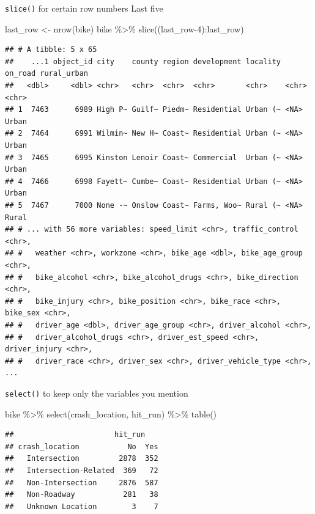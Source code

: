 \documentclass[
  ignorenonframetext,
]{beamer}
\newenvironment{Shaded}{\begin{snugshade}}{\end{snugshade}}
\newcommand{\DecValTok}[1]{\textcolor[rgb]{0.00,0.00,0.81}{#1}}
\newcommand{\FunctionTok}[1]{\textcolor[rgb]{0.00,0.00,0.00}{#1}}
\newcommand{\NormalTok}[1]{#1}
\newcommand{\OtherTok}[1]{\textcolor[rgb]{0.56,0.35,0.01}{#1}}
\newcommand{\SpecialCharTok}[1]{\textcolor[rgb]{0.00,0.00,0.00}{#1}}
\begin{document}
\begin{frame}[fragile]{\texttt{slice()} for certain row numbers}
\protect\hypertarget{slice-for-certain-row-numbers-1}{}
Last five

\begin{Shaded}
\begin{Highlighting}[]
\NormalTok{last\_row }\OtherTok{\textless{}{-}} \FunctionTok{nrow}\NormalTok{(bike)}
\NormalTok{bike }\SpecialCharTok{\%\textgreater{}\%}
  \FunctionTok{slice}\NormalTok{((last\_row}\DecValTok{{-}4}\NormalTok{)}\SpecialCharTok{:}\NormalTok{last\_row)}
\end{Highlighting}
\end{Shaded}

\begin{verbatim}
## # A tibble: 5 x 65
##    ...1 object_id city    county region development locality on_road rural_urban
##   <dbl>     <dbl> <chr>   <chr>  <chr>  <chr>       <chr>    <chr>   <chr>      
## 1  7463      6989 High P~ Guilf~ Piedm~ Residential Urban (~ <NA>    Urban      
## 2  7464      6991 Wilmin~ New H~ Coast~ Residential Urban (~ <NA>    Urban      
## 3  7465      6995 Kinston Lenoir Coast~ Commercial  Urban (~ <NA>    Urban      
## 4  7466      6998 Fayett~ Cumbe~ Coast~ Residential Urban (~ <NA>    Urban      
## 5  7467      7000 None -~ Onslow Coast~ Farms, Woo~ Rural (~ <NA>    Rural      
## # ... with 56 more variables: speed_limit <chr>, traffic_control <chr>,
## #   weather <chr>, workzone <chr>, bike_age <dbl>, bike_age_group <chr>,
## #   bike_alcohol <chr>, bike_alcohol_drugs <chr>, bike_direction <chr>,
## #   bike_injury <chr>, bike_position <chr>, bike_race <chr>, bike_sex <chr>,
## #   driver_age <dbl>, driver_age_group <chr>, driver_alcohol <chr>,
## #   driver_alcohol_drugs <chr>, driver_est_speed <chr>, driver_injury <chr>,
## #   driver_race <chr>, driver_sex <chr>, driver_vehicle_type <chr>, ...
\end{verbatim}
\end{frame}

\begin{frame}[fragile]{\texttt{select()} to keep only the variables you
mention}
\protect\hypertarget{select-to-keep-only-the-variables-you-mention}{}
\begin{Shaded}
\begin{Highlighting}[]
\NormalTok{bike }\SpecialCharTok{\%\textgreater{}\%}
  \FunctionTok{select}\NormalTok{(crash\_location, hit\_run) }\SpecialCharTok{\%\textgreater{}\%}
  \FunctionTok{table}\NormalTok{()}
\end{Highlighting}
\end{Shaded}

\begin{verbatim}
##                       hit_run
## crash_location           No  Yes
##   Intersection         2878  352
##   Intersection-Related  369   72
##   Non-Intersection     2876  587
##   Non-Roadway           281   38
##   Unknown Location        3    7
\end{verbatim}
\end{frame}
\end{document}
